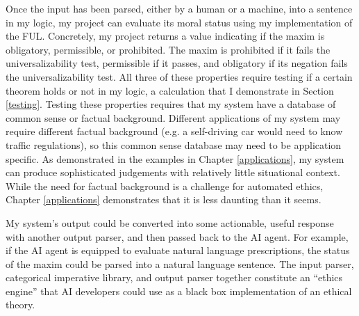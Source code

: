 \begin{isabellebody}
\begin{isamarkuptext}
Once the input has been parsed, either by a human or a machine, into  a sentence in my logic, my 
project can evaluate its moral status using my implementation of 
the FUL. Concretely, my project returns a value indicating if the maxim is obligatory, permissible, 
or prohibited. The maxim is prohibited if it fails the universalizability test, permissible if it passes, and obligatory 
if its negation fails the universalizability test. All three of these properties require testing if a 
certain theorem holds or not in my logic, a calculation that I demonstrate in Section \ref{testing}. 
Testing these properties requires that my system have a database of common sense or factual background. 
Different applications of my system may require different factual background (e.g. a self-driving car 
would need to know traffic regulations), so this common sense database may need to be application 
specific. As demonstrated in the examples in Chapter \ref{applications}, my system can produce sophisticated 
judgements with relatively little situational context. While the need for factual background is a challenge
for automated ethics, Chapter \ref{applications} demonstrates that it is less daunting than it seems. 

My system's output could be converted into some actionable, useful response with another output parser, 
and then passed back to the AI agent. For example, if the AI agent is equipped to evaluate natural 
language prescriptions, the status of the maxim could be parsed into a natural language sentence. The 
input parser, categorical imperative library, and output parser together constitute an ``ethics engine'' 
that AI developers could use as a black box implementation of an ethical theory. 


\end{isamarkuptext}
\end{isabellebody}
